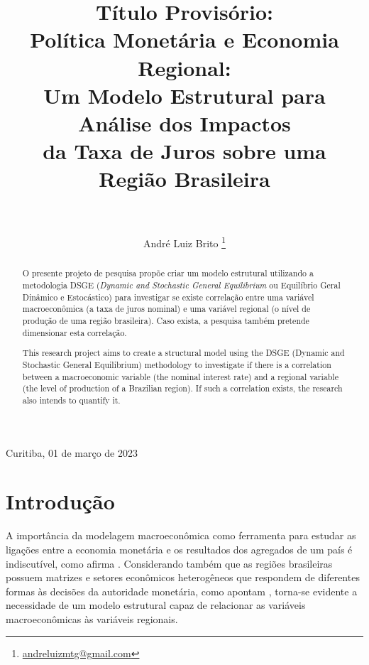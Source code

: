 \documentclass[12pt]{article}
\title{\LARGE Título Provisório: \\ 
	   [1ex] \large
	   Política Monetária e Economia Regional: \\
	   Um Modelo Estrutural para Análise dos Impactos \\
	   da Taxa de Juros sobre uma Região Brasileira}
\author{ \\ \\ \LARGE André Luiz Brito
	\footnote{
		\href{mailto:andreluizmtg@gmail.com}
		{andreluizmtg@gmail.com}}}
\date{}
\numberwithin{equation}{section}
\theoremstyle{definition}
\begin{document}
{\doublespacing
 \maketitle
 }

\vfill

\begin{center}
	Curitiba, 01 de março de 2023
\end{center}


\newpage

{\singlespacing
	\begin{abstract}


O presente projeto de pesquisa propõe criar um modelo estrutural utilizando a metodologia DSGE (\textit{Dynamic and Stochastic General Equilibrium} ou Equilíbrio Geral Dinâmico e Estocástico) para investigar se existe correlação entre uma variável macroeconômica (a taxa de juros nominal) e uma variável regional (o nível de produção de uma região brasileira). Caso exista, a pesquisa também pretende dimensionar esta correlação.
		
	\end{abstract}
}

\newpage

{
	\singlespacing
	\begin{abstract}

This research project aims to create a structural model using the DSGE (Dynamic and Stochastic General Equilibrium) methodology to investigate if there is a correlation between a macroeconomic variable (the nominal interest rate) and a regional variable (the level of production of a Brazilian region). If such a correlation exists, the research also intends to quantify it.

	\end{abstract}
}

\newpage

{\singlespacing
	\tableofcontents
}

\newpage

\section{Introdução}\label{sec:introdução}


A importância da modelagem macroeconômica como ferramenta para estudar as ligações entre a economia monetária e os resultados dos agregados de um país é indiscutível, como afirma \textcite{gali_monetary_2015}. Considerando também que as regiões brasileiras possuem matrizes e setores econômicos heterogêneos que respondem de diferentes formas às decisões da autoridade monetária, como apontam \textcite{bertanha_efeitos_2008}, torna-se evidente a necessidade de um modelo estrutural capaz de relacionar as variáveis macroeconômicas às variáveis regionais.
\end{document}
